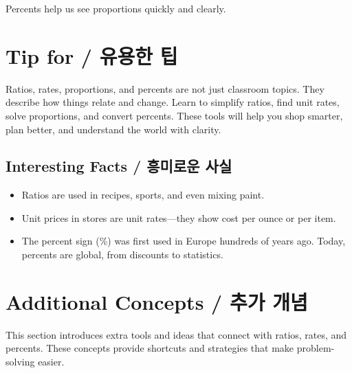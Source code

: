 Percents help us see proportions quickly and clearly.



\newpage
\section{Tip for  / 유용한 팁}
Ratios, rates, proportions, and percents are not just classroom topics. They
describe how things relate and change. Learn to simplify ratios, find unit rates,
solve proportions, and convert percents. These tools will help you shop smarter,
plan better, and understand the world with clarity.

\subsection{Interesting Facts / 흥미로운 사실}
\begin{itemize}
  \item Ratios are used in recipes, sports, and even mixing paint.  

  \item Unit prices in stores are unit rates—they show cost per ounce or per item.  

  \item The percent sign (\%) was first used in Europe hundreds of years ago. Today, percents are global, from discounts to statistics.  
\end{itemize}



























\cleardoublepage
\section{Additional Concepts / 추가 개념}
This section introduces extra tools and ideas that connect with ratios, rates, and percents. These concepts provide shortcuts and strategies that make problem-solving easier.

